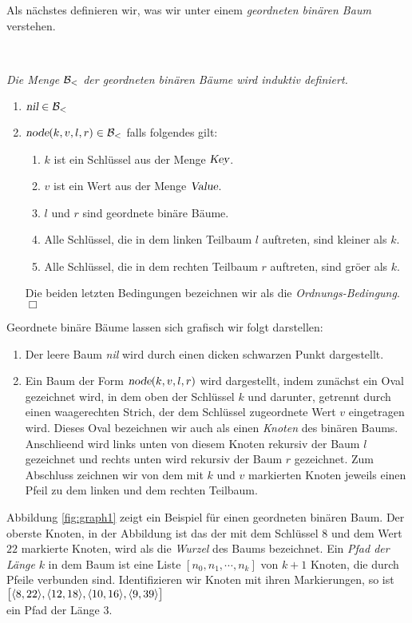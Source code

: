 \noindent
Als n\"achstes definieren wir, was wir unter einem \emph{geordneten bin\"aren Baum} verstehen.
\begin{Definition} \hspace*{\fill} \\
{\em
  Die Menge $\mathcal{B}_<$ der \emph{geordneten bin\"aren B\"aume} wird induktiv definiert.
  \begin{enumerate}
  \item $\textsl{nil} \in \mathcal{B}_<$
  \item $\textsl{node}(k, v, l, r) \in \mathcal{B}_<$ \quad falls folgendes gilt:
        \begin{enumerate}
        \item $k$ ist ein Schl\"ussel aus der Menge $\textsl{Key}$.
        \item $v$ ist ein Wert aus der Menge $\textsl{Value}$.
        \item $l$ und $r$ sind geordnete bin\"are B\"aume.
        \item Alle Schl\"ussel, die in dem linken Teilbaum $l$ auftreten,
              sind kleiner als $k$.
        \item Alle Schl\"ussel, die in dem rechten Teilbaum $r$ auftreten,
              sind gr\"o\3er als $k$.
        \end{enumerate}
        Die beiden letzten  Bedingungen bezeichnen wir als die \emph{Ordnungs-Bedingung}.
        \hspace*{\fill} $\Box$
  \end{enumerate}
}  
\end{Definition}
Geordnete bin\"are B\"aume lassen sich grafisch wir folgt darstellen:
\begin{enumerate}
\item Der leere Baum \textsl{nil} wird durch einen dicken schwarzen Punkt dargestellt.
\item Ein Baum der Form $\textsl{node}(k,v,l,r)$ wird dargestellt,  indem zun\"achst ein
      Oval gezeichnet wird, in dem oben der Schl\"ussel $k$ und darunter, getrennt durch
      einen waagerechten Strich, der dem Schl\"ussel zugeordnete Wert $v$ eingetragen wird.
      Dieses Oval bezeichnen wir auch als einen \emph{Knoten} des bin\"aren Baums.
      Anschlie\3end wird links unten von diesem Knoten rekursiv der Baum $l$ gezeichnet
      und  rechts unten wird rekursiv der Baum $r$ gezeichnet. Zum Abschluss zeichnen wir
      von dem mit $k$ und $v$ markierten Knoten jeweils einen Pfeil zu dem linken und dem
      rechten Teilbaum.
\end{enumerate}
Abbildung \ref{fig:graph1} zeigt ein Beispiel f\"ur einen
geordneten bin\"aren Baum.  Der oberste Knoten, in der Abbildung ist das der mit dem Schl\"ussel
$8$ und dem Wert $22$ markierte Knoten, wird als die \emph{Wurzel} des Baums bezeichnet.
Ein \emph{Pfad der L\"ange} $k$ in dem Baum ist eine Liste $[n_0,n_1, \cdots, n_k]$ von
$k+1$ Knoten, die durch Pfeile verbunden sind. Identifizieren wir Knoten mit ihren
Markierungen, so ist \\[0.1cm]
\hspace*{1.3cm} $\bigl[ \pair(8,22), \pair(12,18), \pair(10,16), \pair(9,39) \bigr]$ \\[0.1cm]
ein Pfad der L\"ange 3.


